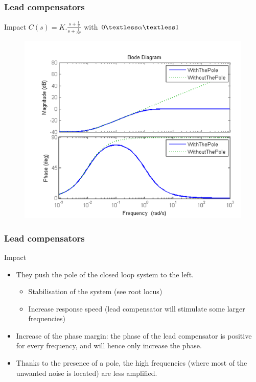 \begin{frame}
	\frametitle{Lead compensators}
	\begin{block}{Impact}
		$C(s) = K.\frac{s + \frac{1}{\tau}}{s + \frac{1}{\alpha\tau}}$ with $0 \textless  \alpha  \textless  1$
		\begin{figure}
			\centering
			\includegraphics[width=0.5
			\linewidth]{leadcompensator1}
		\end{figure}
	\end{block}
\end{frame}

\begin{frame}
\frametitle{Lead compensators}
\begin{block}{Impact}
	\begin{itemize}
	\item They push the pole of the closed loop system to the left.
	\begin{itemize}
	\item Stabilisation of the system (see root locus)
	\item Increase response speed (lead compensator will stimulate some larger frequencies)
	\end{itemize}
	\item Increase of the phase margin: the phase of the lead compensator is positive for every frequency, and will hence only increase the phase.
	\item Thanks to the presence of a pole, the high frequencies (where most of the unwanted noise is located) are less amplified.
	
	\end{itemize}
\end{block}
\end{frame}

